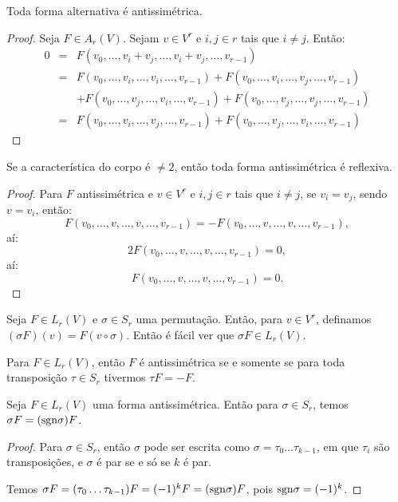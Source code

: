 \documentclass[11pt,twoside,a4paper]{book}
\begin{document}
\begin{proposicao}
Toda forma alternativa é antissimétrica.
\end{proposicao}
\begin{proof}
Seja $F\in A_r(V)$. Sejam $v\in V^r$ e $i,j\in r$ tais que $i\neq j$. Então:
\[
\begin{array}{rcl}
0&=&F(v_0,\dots,v_i+v_j,\dots,v_i+v_j,\dots,v_{r-1})\\&=&F(v_0,\dots,v_i,\dots,v_i,\dots,v_{r-1})+F(v_0,\dots,v_i,\dots,v_j,\dots,v_{r-1})\\&&+F(v_0,\dots,v_j,\dots,v_i,\dots,v_{r-1})+F(v_0,\dots,v_j,\dots,v_j,\dots,v_{r-1})\\&=&F(v_0,\dots,v_i,\dots,v_j,\dots,v_{r-1})+F(v_0,\dots,v_j,\dots,v_i,\dots,v_{r-1})
\end{array}
\]
\end{proof}

\begin{proposicao}
Se a característica do corpo é $\neq 2$, então toda forma antissimétrica é reflexiva.
\end{proposicao}
\begin{proof}
Para $F$ antissimétrica e $v\in V^r$ e $i,j\in r$ tais que $i\neq j$, se $v_i=v_j$, sendo $v=v_i$, então:
\[
F(v_0,\dots,v,\dots,v,\dots,v_{r-1})=-F(v_0,\dots,v,\dots,v,\dots,v_{r-1}),
\]
aí:
\[
2F(v_0,\dots,v,\dots,v,\dots,v_{r-1})=0,
\]
aí:
\[
F(v_0,\dots,v,\dots,v,\dots,v_{r-1})=0.
\]
\end{proof}

\begin{definicao}
Seja $F\in L_r(V)$ e $\sigma\in S_r$ uma permutação. Então, para $v\in V^r$, definamos $(\sigma F)(v)=F(v\circ\sigma)$. Então é fácil ver que $\sigma F\in L_r(V)$.
\end{definicao}

\begin{observacao}
Para $F\in L_r(V)$, então $F$ é antissimétrica se e somente se para toda transposição $\tau\in S_r$ tivermos $\tau F=-F$.
\end{observacao}

\begin{proposicao}
Seja $F\in L_r(V)$ uma forma antissimétrica. Então para $\sigma\in S_r$, temos $\sigma F=({\rm sgn}\sigma)F$.
\end{proposicao}
\begin{proof}
Para $\sigma\in S_r$, então $\sigma$ pode ser escrita como $\sigma=\tau_0\dots\tau_{k-1}$, em que $\tau_i$ são transposições, e $\sigma$ é par se e só se $k$ é par.

\medskip
\noindent
Temos $\sigma F=(\tau_0\dots\tau_{k-1})F=(-1)^k F=({\rm sgn}\sigma)F$, pois ${\rm sgn}\sigma=(-1)^k$.
\end{proof}
\end{document}
